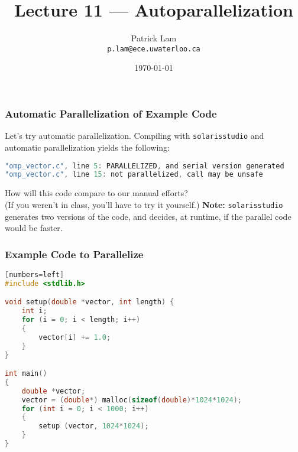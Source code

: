 

\title{Lecture 11 --- Autoparallelization }

\author{Patrick Lam \\ \small \texttt{p.lam@ece.uwaterloo.ca}}
\date{\today}




\begin{frame}
  \titlepage

 \end{frame}

\begin{frame}[fragile]
  \frametitle{Automatic Parallelization of Example Code}


  Let's try automatic parallelization.
  \vfill
  Compiling with {\tt solarisstudio} and automatic parallelization yields
  the following:


{\scriptsize
  \begin{lstlisting}[language=C]
% solarisstudio-cc -O3 -xautopar -xloopinfo omp_vector.c 
"omp_vector.c", line 5: PARALLELIZED, and serial version generated                 
"omp_vector.c", line 15: not parallelized, call may be unsafe
  \end{lstlisting}
}

  How will this code compare to our manual efforts? \\
  (If you weren't in class, you'll have to try it yourself.)
  \vfill
  {\bf Note:} {\tt solarisstudio} generates two versions of the code, 
  and decides, at runtime, if the parallel code would be faster.


\end{frame}

\begin{frame}[fragile]
  \frametitle{Example Code to Parallelize}


  \begin{lstlisting}[language=C][numbers=left]
#include <stdlib.h>

void setup(double *vector, int length) {
    int i;
    for (i = 0; i < length; i++)
    {
        vector[i] += 1.0;
    }
}

int main()
{
    double *vector;
    vector = (double*) malloc(sizeof(double)*1024*1024);
    for (int i = 0; i < 1000; i++)
    {
        setup (vector, 1024*1024);
    }
}
  \end{lstlisting}

\end{frame}

